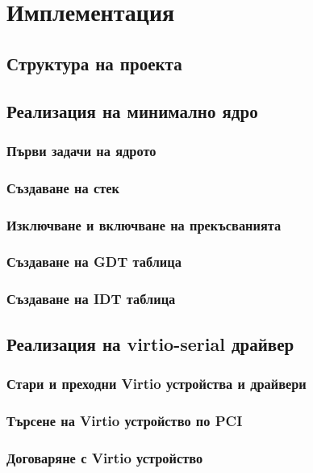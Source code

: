 \chapter{Имплементация} %
\section{Структура на проекта}

\section{Реализация на минимално ядро}
  \subsection{Първи задачи на ядрото}

  \subsection{Създаване на стек}

  \subsection{Изключване и включване на прекъсванията}

  \subsection{Създаване на GDT таблица}

  \subsection{Създаване на IDT таблица}

\section{Реализация на virtio-serial драйвер}
  \subsection{Стари и преходни Virtio устройства и драйвери}

  \subsection{Търсене на Virtio устройство по PCI}

  \subsection{Договаряне с Virtio устройство}


